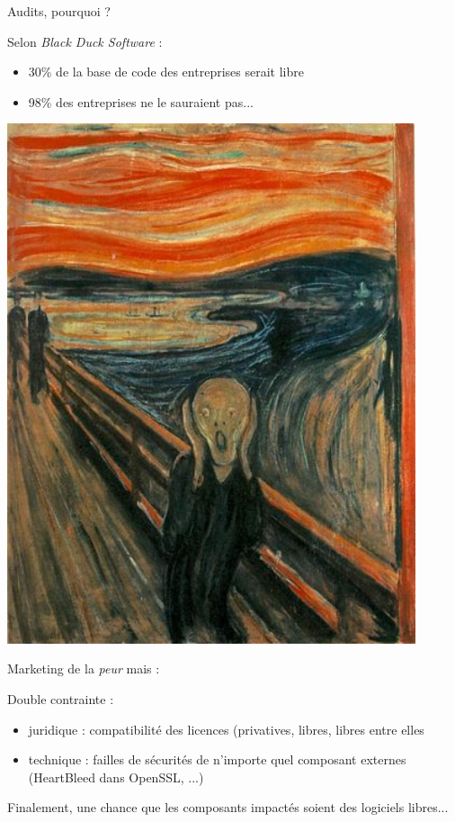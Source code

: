 \documentclass{beamer}
\begin{document}
\begin{frame}{Audits, pourquoi ?}

Selon \textit{Black Duck Software} :
\begin{itemize}
\item 30\% de la base de code des entreprises serait libre
\item 98\% des entreprises ne le sauraient pas...

\end{itemize}
\begin{minipage}[c]{0.4\linewidth}
\includegraphics[width=0.9\textwidth]{images/The_Scream.jpg}\end{minipage}
\begin{minipage}[c]{0.5\linewidth}
Marketing de la \textit{peur} mais :

Double contrainte :
\begin{itemize}
\item juridique : compatibilité des licences (privatives, libres, libres entre elles
\item technique : failles de sécurités de n'importe quel composant externes (HeartBleed dans OpenSSL, ...)
\end{itemize}
\end{minipage}
Finalement, une chance que les composants impactés soient des logiciels libres...
  
\end{frame}
\end{document}
